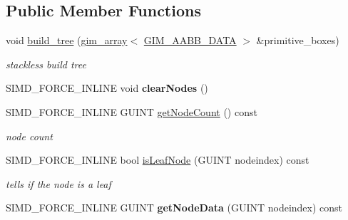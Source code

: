 \subsection*{Public Member Functions}
\textbf{ }\par
\begin{DoxyCompactItemize}
\item 
void \hyperlink{classGIM__BOX__TREE_af76fa1d2f5e20c8979120fa72cf7575f}{build\+\_\+tree} (\hyperlink{classgim__array}{gim\+\_\+array}$<$ \hyperlink{structGIM__AABB__DATA}{G\+I\+M\+\_\+\+A\+A\+B\+B\+\_\+\+D\+A\+TA} $>$ \&primitive\+\_\+boxes)
\begin{DoxyCompactList}\small\item\em stackless build tree \end{DoxyCompactList}\item 
\mbox{\label{classGIM__BOX__TREE_aa016c5ef3669d464ed15eb18b7308b62}} 
S\+I\+M\+D\+\_\+\+F\+O\+R\+C\+E\+\_\+\+I\+N\+L\+I\+NE void {\bfseries clear\+Nodes} ()
\item 
\mbox{\label{classGIM__BOX__TREE_ae5ee83e6bf9ba2d96cbbb9d7ecc20b40}} 
S\+I\+M\+D\+\_\+\+F\+O\+R\+C\+E\+\_\+\+I\+N\+L\+I\+NE G\+U\+I\+NT \hyperlink{classGIM__BOX__TREE_ae5ee83e6bf9ba2d96cbbb9d7ecc20b40}{get\+Node\+Count} () const
\begin{DoxyCompactList}\small\item\em node count \end{DoxyCompactList}\item 
\mbox{\label{classGIM__BOX__TREE_ac7fc7775379fc52f52eee28a81e22f05}} 
S\+I\+M\+D\+\_\+\+F\+O\+R\+C\+E\+\_\+\+I\+N\+L\+I\+NE bool \hyperlink{classGIM__BOX__TREE_ac7fc7775379fc52f52eee28a81e22f05}{is\+Leaf\+Node} (G\+U\+I\+NT nodeindex) const
\begin{DoxyCompactList}\small\item\em tells if the node is a leaf \end{DoxyCompactList}\item 
\mbox{\label{classGIM__BOX__TREE_acfba452c43dcb2687a1d3351c2018fe0}} 
S\+I\+M\+D\+\_\+\+F\+O\+R\+C\+E\+\_\+\+I\+N\+L\+I\+NE G\+U\+I\+NT {\bfseries get\+Node\+Data} (G\+U\+I\+NT nodeindex) const
\item 
\mbox{\label{classGIM__BOX__TREE_a6c4cfc0acab435c1407f9621c6d31777}} 

\end{DoxyCompactItemize}
